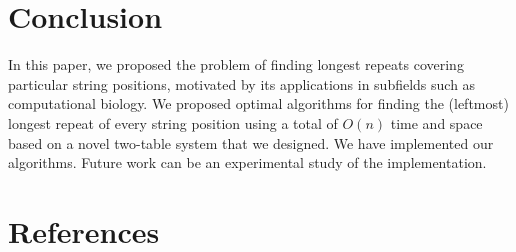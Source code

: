 \documentclass[preprint]{elsarticle}
\newcommand{\remove}[1]{}
\DeclareMathOperator{\lr}{\mathit{LR}}
\DeclareMathOperator{\llrs}{\mathit{LLRS}}
\begin{document}
\remove{

\subsection{Extension: finding all LRs of every string position (REMOVE IT !)}
\label{subsec:ext}

It is possible that a particular position can have multiple LRs.  For
example, if $S={\tt abcabcddbca}$, then $\lr_2$ can be either
$S[1\ldots 3]={\tt abc}$ or $S[2\ldots 4]={\tt bca}$.  However,
Algorithm~\ref{algo:every-one} only returns one of them and resolve
the tie by picking the leftmost one. However, it is easy to modify
Algorithm~\ref{algo:every-one} to return all the LRs of every string
position, without changing the mechanism that maintains the
two-table system.

Idea: 

When processing an $\llrs[i]$,

(1) if its left-end has its lr already calculated in the past, simply
travel from $next\Bigl[ptr\bigl[\llrs[i].start\bigr]\Bigr]$ toward the
left end of $\llrs[i]$ and will stop when seeing a position whose lr's
length is larger than $\llrs[i].length$. Those positions travelled
through will have another LR just calculated as $\llrs[i]$.

(2) similarly handle the right side. 

}




\section{Conclusion}
In this paper, we proposed the problem of finding longest repeats
covering particular string positions, motivated by its applications in
subfields such as computational biology. We proposed optimal
algorithms for finding the (leftmost) longest repeat of every string
position using a total of $O(n)$ time and space based on a novel
two-table system that we designed. We have implemented our
algorithms. Future work can be an
experimental study of the implementation.

 
\section*{References}

\small 




\end{document}
